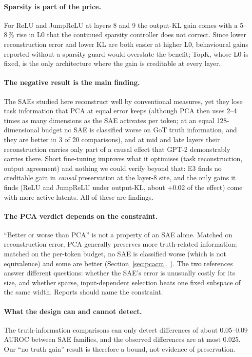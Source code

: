 \paragraph{Sparsity is part of the price.} For ReLU and JumpReLU at layers 8 and 9 the output-KL gain comes with a
5--8\,\% rise in L0 that the continued sparsity controller does not correct. Since lower reconstruction error and
lower KL are both easier at higher L0, behavioural gains reported without a sparsity guard would overstate the
benefit; TopK, whose L0 is fixed, is the only architecture where the gain is creditable at every layer.

\paragraph{The negative result is the main finding.} The SAEs studied here reconstruct well by conventional measures,
yet they lose task information that PCA at equal error keeps (although PCA then uses 2--4 times as many dimensions as
the SAE activates per token; at an equal 128-dimensional budget no SAE is classified worse on GoT truth information, and they are
better in 3 of 20 comparisons), and at mid and late layers their reconstruction carries
only part of a causal effect that GPT-2 demonstrably carries there. Short fine-tuning improves what it optimises
(task reconstruction, output agreement) and nothing we could verify beyond that: E3 finds no creditable gain in
\emph{causal} preservation at the layer-8 site, and the only gains it finds (ReLU and JumpReLU under output-KL, about
+0.02 of the effect) come with more active latents. All of these are  findings.

\paragraph{The PCA verdict depends on the constraint.} ``Better or worse than PCA'' is not a property of an SAE
alone. Matched on reconstruction error, PCA generally preserves more truth-related information; matched on the
per-token budget, no SAE is classified worse (which is not equivalence) and some are better (Section~\ref{sec:pcacm}, ). The
two references answer different questions: whether the SAE's error is unusually costly for its size, and whether
sparse, input-dependent selection beats one fixed subspace of the same width. Reports should name the constraint.

\paragraph{What the design can and cannot detect.} The truth-information comparisons can only detect differences of
about 0.05--0.09 AUROC between SAE families, and the observed differences are at most 0.025. Our ``no truth gain''
result is therefore a bound, not evidence of preservation.

